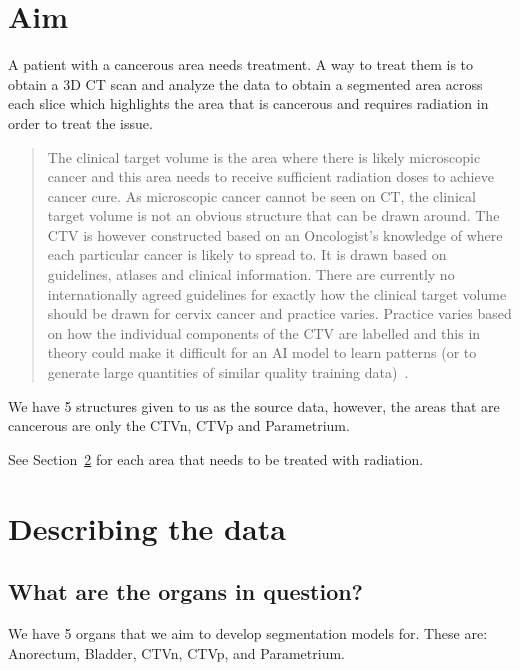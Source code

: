 \documentclass[11pt]{article}
\begin{document}


\tableofcontents

\clearpage

\section{Aim}

A patient with a cancerous area needs treatment. A way to treat them is to obtain a 3D CT scan and analyze the data to obtain a segmented area across each slice which highlights the area that is cancerous and requires radiation in order to treat the issue.

\begin{quote}
    The clinical target volume is the area where there is likely microscopic cancer and this area needs to receive sufficient radiation doses to achieve cancer cure. As microscopic cancer cannot be seen on CT, the clinical target volume is not an obvious structure that can be drawn around. The CTV is however constructed based on an Oncologist's knowledge of where each particular cancer is likely to spread to. It is drawn based on guidelines, atlases and clinical information. There are currently no internationally agreed guidelines for exactly how the clinical target volume should be drawn for cervix cancer and practice varies. Practice varies based on how the individual components of the CTV are labelled and this in theory could make it difficult for an AI model to learn patterns (or to generate large quantities of similar quality training data)~\cite{AMLART-data}.
\end{quote}

We have 5 structures given to us as the source data, however, the areas that are cancerous are only the CTVn, CTVp and Parametrium. 

See Section~\ref{ref:DescribingTheData} for each area that needs to be treated with radiation.

\section{Describing the data}\label{ref:DescribingTheData}

\subsection{What are the organs in question?}

We have 5 organs that we aim to develop segmentation models for. These are: Anorectum, Bladder, CTVn, CTVp, and Parametrium.
\end{document}

